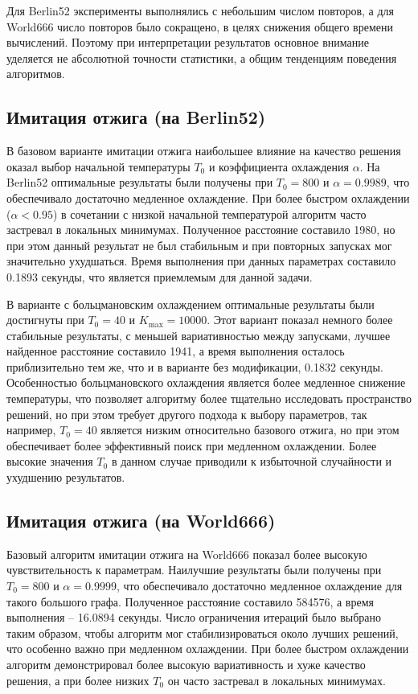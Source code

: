 \documentclass[12pt,a4paper]{article}
\begin{document}
Для Berlin52 эксперименты выполнялись с небольшим числом повторов, а для World666
число повторов было сокращено, в целях снижения общего времени вычислений. Поэтому
при интерпретации результатов основное внимание уделяется не абсолютной точности
статистики, а общим тенденциям поведения алгоритмов.

\subsection{Имитация отжига (на Berlin52)}

В базовом варианте имитации отжига наибольшее влияние на качество решения оказал
выбор начальной температуры $T_0$ и коэффициента охлаждения $\alpha$.
На Berlin52 оптимальные результаты были получены при $T_0=800$ и $\alpha=0.9989$,
что обеспечивало достаточно медленное охлаждение. При более быстром охлаждении
($\alpha < 0.95$) в сочетании с низкой начальной температурой алгоритм часто застревал
в локальных минимумах. Полученное расстояние составило 1980, но при этом данный результат
не был стабильным и при повторных запусках мог значительно ухудшаться. Время выполнения
при данных параметрах составило 0.1893 секунды, что является приемлемым для данной задачи.

В варианте с больцмановским охлаждением оптимальные результаты были достигнуты при
$T_0=40$ и $K_{\max}=10000$. Этот вариант показал немного более стабильные результаты,
с меньшей вариативностью между запусками, лучшее найденное расстояние составило 1941,
а время выполнения осталось приблизительно тем же, что и в варианте без модификации,
0.1832 секунды. Особенностью больцмановского охлаждения является более медленное
снижение температуры, что позволяет алгоритму более тщательно исследовать пространство
решений, но при этом требует другого подхода к выбору параметров, так например,
$T_0=40$ является низким относительно базового отжига, но при этом обеспечивает более
эффективный поиск при медленном охлаждении. Более высокие значения $T_0$ в данном случае
приводили к избыточной случайности и ухудшению результатов.

\subsection{Имитация отжига (на World666)}

Базовый алгоритм имитации отжига на World666 показал более высокую чувствительность к параметрам.
Наилучшие результаты были получены при $T_0=800$ и $\alpha=0.9999$, что обеспечивало достаточно
медленное охлаждение для такого большого графа. Полученное расстояние составило 584576, а время
выполнения -- 16.0894 секунды. Число ограничения итераций было выбрано таким образом, чтобы
алгоритм мог стабилизироваться около лучших решений, что особенно важно при медленном охлаждении.
При более быстром охлаждении алгоритм демонстрировал более высокую вариативность и хуже качество
решения, а при более низких $T_0$ он часто застревал в локальных минимумах.
\end{document}
